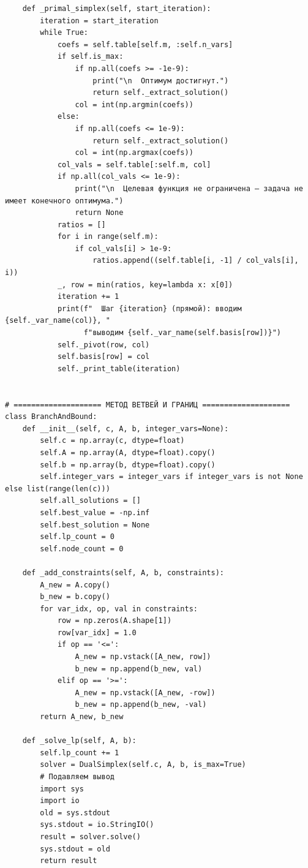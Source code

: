 \documentclass[oneside,a4paper,14pt]{extarticle}
\begin{document}
\begin{verbatim}
    def _primal_simplex(self, start_iteration):
        iteration = start_iteration
        while True:
            coefs = self.table[self.m, :self.n_vars]
            if self.is_max:
                if np.all(coefs >= -1e-9):
                    print("\n  Оптимум достигнут.")
                    return self._extract_solution()
                col = int(np.argmin(coefs))
            else:
                if np.all(coefs <= 1e-9):
                    return self._extract_solution()
                col = int(np.argmax(coefs))
            col_vals = self.table[:self.m, col]
            if np.all(col_vals <= 1e-9):
                print("\n  Целевая функция не ограничена — задача не имеет конечного оптимума.")
                return None
            ratios = []
            for i in range(self.m):
                if col_vals[i] > 1e-9:
                    ratios.append((self.table[i, -1] / col_vals[i], i))
            _, row = min(ratios, key=lambda x: x[0])
            iteration += 1
            print(f"  Шаг {iteration} (прямой): вводим {self._var_name(col)}, "
                  f"выводим {self._var_name(self.basis[row])}")
            self._pivot(row, col)
            self.basis[row] = col
            self._print_table(iteration)


# ==================== МЕТОД ВЕТВЕЙ И ГРАНИЦ ====================
class BranchAndBound:
    def __init__(self, c, A, b, integer_vars=None):
        self.c = np.array(c, dtype=float)
        self.A = np.array(A, dtype=float).copy()
        self.b = np.array(b, dtype=float).copy()
        self.integer_vars = integer_vars if integer_vars is not None else list(range(len(c)))
        self.all_solutions = []
        self.best_value = -np.inf
        self.best_solution = None
        self.lp_count = 0
        self.node_count = 0

    def _add_constraints(self, A, b, constraints):
        A_new = A.copy()
        b_new = b.copy()
        for var_idx, op, val in constraints:
            row = np.zeros(A.shape[1])
            row[var_idx] = 1.0
            if op == '<=':
                A_new = np.vstack([A_new, row])
                b_new = np.append(b_new, val)
            elif op == '>=':
                A_new = np.vstack([A_new, -row])
                b_new = np.append(b_new, -val)
        return A_new, b_new

    def _solve_lp(self, A, b):
        self.lp_count += 1
        solver = DualSimplex(self.c, A, b, is_max=True)
        # Подавляем вывод
        import sys
        import io
        old = sys.stdout
        sys.stdout = io.StringIO()
        result = solver.solve()
        sys.stdout = old
        return result


\end{verbatim}
\end{document}
